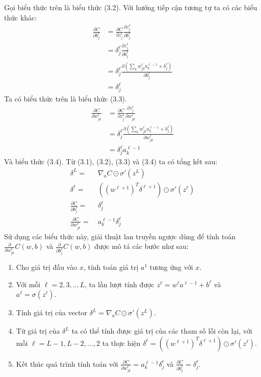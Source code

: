 Gọi biểu thức trên là biểu thức (3.2). Với hướng tiếp cận tương tự ta có các 
biểu thức khác:
\begin{align*}
  \frac{\partial C}{\partial b_j^\ell}&=\frac{\partial C}{\partial z_j^\ell}\frac{\partial z_j^\ell}{\partial b_j^\ell}\\
  &=\delta_j^\ell\frac{\partial z_j^\ell}{\partial b_j^\ell}\\
  &=\delta_j^\ell\frac{\partial(\sum_k w_{jk}^\ell a_k^{\ell-1} + b_j^\ell)}{\partial b_j^\ell}\\
  &=\delta_j^\ell
\end{align*}
Ta có biểu thức trên là biểu thức (3.3).
\begin{align*}
  \frac{\partial C}{\partial w_{jk}^\ell}&=\frac{\partial C}{\partial z_j^\ell}\frac{\partial z_j^\ell}{\partial w_{jk}^\ell}\\
  &=\delta_j^\ell\frac{\partial(\sum_k w_{jk}^\ell a_k^{\ell-1} + b_j^\ell)}{\partial w_{jk}^\ell}\\
  &=\delta_j^\ell a_k^{\ell-1}
\end{align*}
Và biểu thức (3.4). Từ (3.1), (3.2), (3.3) và (3.4) ta có tổng kết sau:
\begin{align}
  \delta^L =& \: \nabla_aC\odot\sigma'(z^L) \\
  \delta^\ell =& \: ((w^{\ell+1})^T\delta^{\ell+1})\odot\sigma'(z^\ell) \\
  \frac{\partial C}{\partial b_j^\ell} =& \: \delta_j^\ell \\
  \frac{\partial C}{\partial w_{jk}^\ell} =& \: a_k^{\ell-1}\delta_j^\ell
\end{align}
Sử dụng các biểu thức này, giải thuật lan truyền ngược dùng để tính toán 
$\frac{\partial}{\partial w_{jk}^\ell}C(w,b)$ và 
$\frac{\partial}{\partial b_j^\ell}C(w,b)$ được mô tả các bước như sau:
\begin{enumerate}
\item Cho giá trị đầu vào $x$, tính toán giá trị $a^1$ tương ứng với $x$.
\item Với mỗi $\ell=2,3,..,L$, ta lần lượt tính được $z^\ell=w^\ell a^{\ell-1}+b^\ell$ 
và $a^\ell=\sigma(z^\ell)$.
\item Tính giá trị của vector $\delta^L=\nabla_aC\odot\sigma'(z^L)$.
\item Từ giá trị của $\delta^L$ ta có thể tính được giá trị của các tham số lỗi 
còn lại, với mỗi $\ell=L-1,L-2,...,2$ ta thực hiện $\delta^\ell=((w^{\ell+1})^T\delta^{\ell+1})\odot\sigma'(z^\ell)$.
\item Kết thúc quá trình tính toán với $\frac{\partial C}{\partial w_{jk}^\ell}=a_k^{\ell-1}\delta_j^\ell$ và 
$\frac{\partial C}{\partial b_j^\ell}=\delta_j^\ell$.
\end{enumerate}